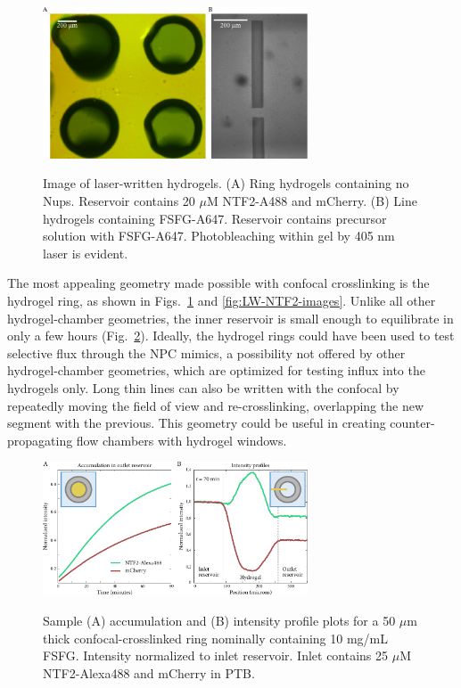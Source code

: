 \begin{figure} %
\caption{Image of laser-written hydrogels. (A) Ring hydrogels containing no Nups.  Reservoir contains 20 $\mu$M NTF2-A488 and mCherry. (B) Line hydrogels containing FSFG-A647. Reservoir contains precursor solution with FSFG-A647. Photobleaching within gel by 405 nm laser is evident.}
\centering
\includegraphics[width=0.7\textwidth]{figs/ch03/example-LW-gels}
\label{fig:LW-gel-images}
\end{figure} %

The most appealing geometry made possible with confocal crosslinking is the hydrogel ring, as shown in Figs.~\ref{fig:LW-gel-images} and \ref{fig:LW-NTF2-images}.  Unlike all other hydrogel-chamber geometries, the inner reservoir is small enough to equilibrate in only a few hours (Fig.~\ref{fig:ring-acc-and-profile}).  Ideally, the hydrogel rings could have been used to test selective flux through the NPC mimics, a possibility not offered by other hydrogel-chamber geometries, which are optimized for testing influx into the hydrogels only.  Long thin lines can also be written with the confocal by repeatedly moving the field of view and re-crosslinking, overlapping the new segment with the previous.  This geometry could be useful in creating counter-propagating flow chambers with hydrogel windows.

\begin{figure} %
  \centering
  \caption{Sample (A) accumulation and (B) intensity profile plots for a 50 $\mu$m thick confocal-crosslinked ring nominally containing 10 mg/mL FSFG. Intensity normalized to inlet reservoir.  Inlet contains 25 $\mu$M NTF2-Alexa488 and mCherry in PTB.\\}
  \includegraphics[width=0.7\textwidth]{figs/ch03/ring-acc-and-profile}
\label{fig:ring-acc-and-profile}
\end{figure} %

